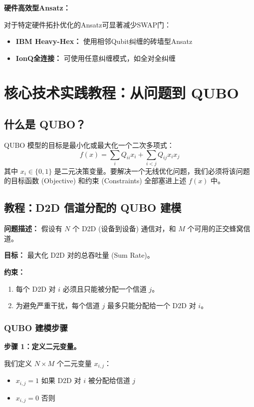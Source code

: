 \documentclass[11pt,a4paper]{article}
\begin{document}
\textbf{硬件高效型Ansatz：}

对于特定硬件拓扑优化的Ansatz可显著减少SWAP门：
\begin{itemize}
\item \textbf{IBM Heavy-Hex：} 使用相邻Qubit纠缠的砖墙型Ansatz
\item \textbf{IonQ全连接：} 可使用任意纠缠模式，如全对全纠缠
\end{itemize}

\section{核心技术实践教程：从问题到 QUBO}

\subsection{什么是 QUBO？}

QUBO 模型的目标是最小化或最大化一个二次多项式：
\[f(x) = \sum_{i} Q_{ii} x_i + \sum_{i<j} Q_{ij} x_i x_j\]
其中 $x_i \in \{0, 1\}$ 是二元决策变量。要解决一个无线优化问题，我们必须将该问题的目标函数 (Objective) 和约束 (Constraints) 全部塞进上述 $f(x)$ 中。

\subsection{教程：D2D 信道分配的 QUBO 建模}

\textbf{问题描述：} 假设有 $N$ 个 D2D (设备到设备) 通信对，和 $M$ 个可用的正交蜂窝信道。

\textbf{目标：} 最大化 D2D 对的总吞吐量 (Sum Rate)。

\textbf{约束：}
\begin{enumerate}
\item 每个 D2D 对 $i$ 必须且只能被分配一个信道 $j$。
\item 为避免严重干扰，每个信道 $j$ 最多只能分配给一个 D2D 对 $i$。
\end{enumerate}

\subsubsection{QUBO 建模步骤}

\textbf{步骤 1：定义二元变量。}

我们定义 $N \times M$ 个二元变量 $x_{i,j}$：
\begin{itemize}
\item $x_{i,j} = 1$ 如果 D2D 对 $i$ 被分配给信道 $j$
\item $x_{i,j} = 0$ 否则
\end{itemize}
\end{document}
